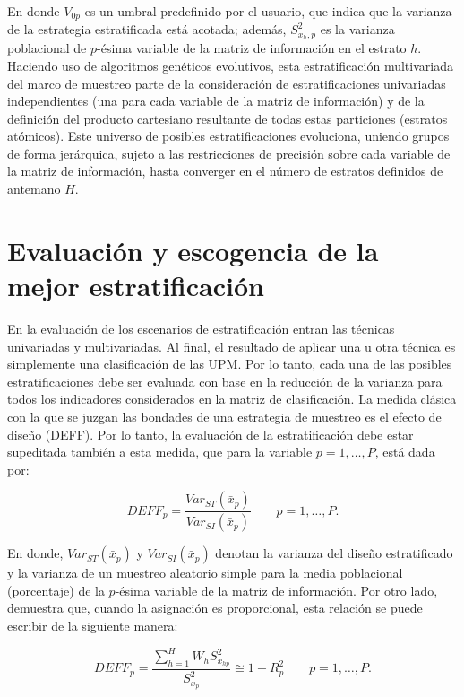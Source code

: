 \documentclass[
  12pt,
]{book}
\begin{document}
En donde \(V_{0p}\) es un umbral predefinido por el usuario, que indica que la varianza de la estrategia estratificada está acotada; además, \(S^2_{x_h,p}\) es la varianza poblacional de \(p\)-ésima variable de la matriz de información en el estrato \(h\).
Haciendo uso de algoritmos genéticos evolutivos, esta estratificación multivariada del marco de muestreo parte de la consideración de estratificaciones univariadas independientes (una para cada variable de la matriz de información) y de la definición del producto cartesiano resultante de todas estas particiones (estratos atómicos). Este universo de posibles estratificaciones evoluciona, uniendo grupos de forma jerárquica, sujeto a las restricciones de precisión sobre cada variable de la matriz de información, hasta converger en el número de estratos definidos de antemano \(H\).

\hypertarget{evaluaciuxf3n-y-escogencia-de-la-mejor-estratificaciuxf3n}{%
\section{Evaluación y escogencia de la mejor estratificación}\label{evaluaciuxf3n-y-escogencia-de-la-mejor-estratificaciuxf3n}}

En la evaluación de los escenarios de estratificación entran las técnicas univariadas y multivariadas. Al final, el resultado de aplicar una u otra técnica es simplemente una clasificación de las UPM. Por lo tanto, cada una de las posibles estratificaciones debe ser evaluada con base en la reducción de la varianza para todos los indicadores considerados en la matriz de clasificación. La medida clásica con la que se juzgan las bondades de una estrategia de muestreo es el efecto de diseño (DEFF). Por lo tanto, la evaluación de la estratificación debe estar supeditada también a esta medida, que para la variable \(p = 1, \ldots, P\), está dada por:

\[
DEFF_p = \frac{Var_{ST}(\bar x _p)}{Var_{SI}(\bar x _p)} \ \ \ \ \ \ \ \ \ p = 1, \ldots, P.
\]

En donde, \(Var_{ST}(\bar x _p)\) y \(Var_{SI}(\bar x _p)\) denotan la varianza del diseño estratificado y la varianza de un muestreo aleatorio simple para la media poblacional (porcentaje) de la \(p\)-ésima variable de la matriz de información. Por otro lado, \citet[página 184]{Gutierrez_2016} demuestra que, cuando la asignación es proporcional, esta relación se puede escribir de la siguiente manera:

\[
DEFF_p = \frac{ \sum_{h=1}^H W_h S^2_{x_{hp}} }{S^2_{x_p}} \cong 1 - R^2_p \ \ \ \ \ \ \ \ \ p = 1, \ldots, P.
\]
\end{document}
